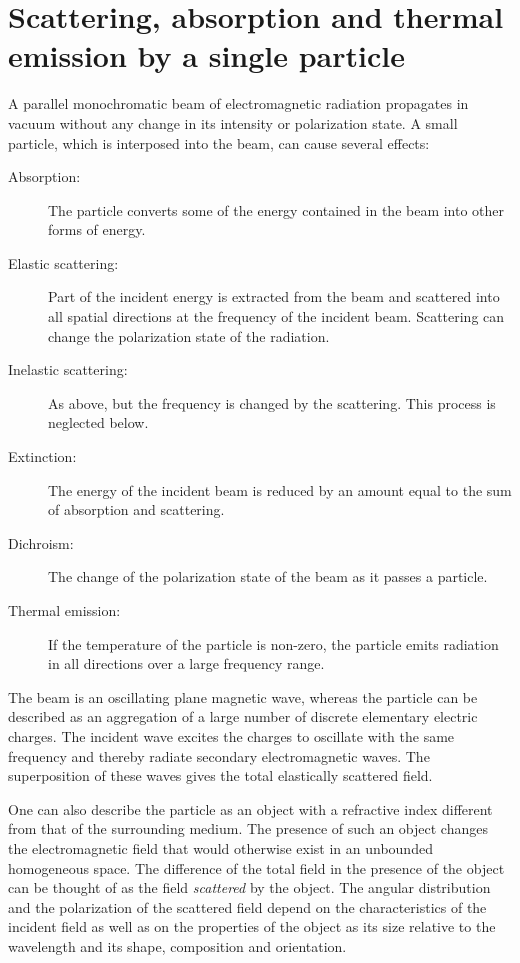 \section[Single particle scattering]
{Scattering, absorption and thermal emission by a single particle}
\label{sec:rtetheory:theory_single_part}

A parallel monochromatic beam of electromagnetic radiation propagates
in vacuum without any change in its intensity or polarization state. A
small particle, which is interposed into the beam, can cause several
effects:
\begin{description}
\item[Absorption:] The particle converts some of the energy
  contained in the beam into other forms of energy.
\item[Elastic scattering:] Part of the incident energy is
  extracted from the beam and scattered into all spatial directions at
  the frequency of the incident beam. Scattering can change the
  polarization state of the radiation.
\item[Inelastic scattering:] As above, but the frequency is changed by the
  scattering. This process is neglected below.
\item[Extinction:] The energy of the incident beam is reduced by
  an amount equal to the sum of absorption and scattering.
\item[Dichroism:] The change of the polarization state of the beam
  as it passes a particle.
\item[Thermal emission:] If the temperature of the particle is
  non-zero, the particle emits radiation in all directions over a
  large frequency range.
\end{description}
The beam is an oscillating plane magnetic wave, whereas the particle
can be described as an aggregation of a large number of discrete
elementary electric charges. The incident wave excites the charges to
oscillate with the same frequency and thereby radiate secondary
electromagnetic waves. The superposition of these waves gives the
total elastically scattered field.

One can also describe the particle as an object with a refractive
index different from that of the surrounding medium. The presence of
such an object changes the electromagnetic field that would otherwise
exist in an unbounded homogeneous space. The difference of the total
field in the presence of the object can be thought of as the field
\emph{scattered} by the object. The angular distribution and the
polarization of the scattered field depend on the characteristics of
the incident field as well as on the properties of the object as its
size relative to the wavelength and its shape, composition and
orientation.

